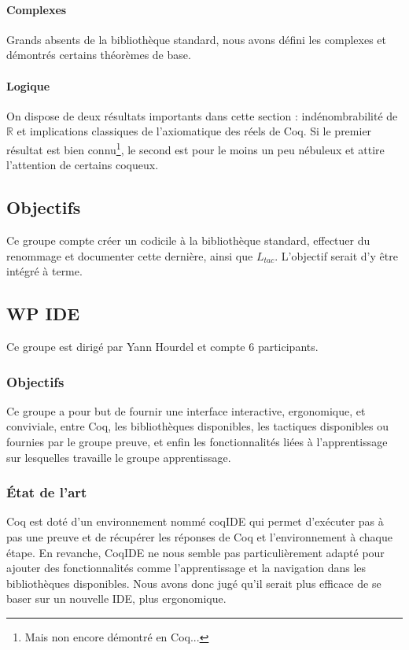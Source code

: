 \documentclass[a4paper,10pt]{article}
\begin{document}
\paragraph{Complexes}

Grands absents de la bibliothèque standard, nous avons défini les complexes et démontrés certains théorèmes de base.

\paragraph{Logique}

On dispose de deux résultats importants dans cette section : indé\-nom\-brabilité de $\mathbb{R}$ et implications classiques de l'axiomatique des réels de Coq. Si le premier résultat est bien connu\footnote{Mais non encore démontré en Coq...}, le second est pour le moins un peu nébuleux et attire l'attention de certains coqueux.

\subsection{Objectifs}

Ce groupe compte créer un codicile à la bibliothèque standard, effectuer du renommage et documenter cette dernière, ainsi que $L_{tac}$. L'objectif serait d'y être intégré à terme.

\subsection{WP IDE}

Ce groupe est dirigé par Yann Hourdel et compte 6 participants.

\subsubsection{Objectifs}

Ce groupe a pour but de fournir une interface interactive, ergonomique, et conviviale, entre Coq, les bibliothèques disponibles, les tactiques disponibles ou fournies par le groupe preuve, et enfin les fonctionnalités liées à l'apprentissage sur lesquelles travaille le groupe apprentissage.

\subsubsection{État de l'art}

Coq est doté d'un environnement nommé coqIDE qui permet d'exécuter pas à pas une preuve et de récupérer les réponses de Coq et l'environnement à chaque étape. En revanche, CoqIDE ne nous semble pas particulièrement adapté pour ajouter des fonctionnalités comme l'apprentissage et la navigation dans les bibliothèques disponibles. Nous avons donc jugé qu'il serait plus efficace de se baser sur un nouvelle IDE, plus ergonomique.
\end{document}
